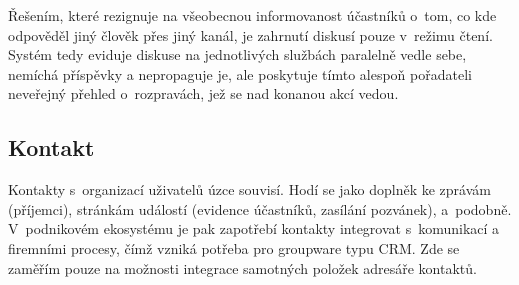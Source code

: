 \documentclass[12pt,oneside,final]{fithesis2}
\begin{document}
Řešením, které rezignuje na všeobecnou informovanost účastníků o~tom, co kde odpověděl jiný člověk přes jiný kanál, je zahrnutí diskusí pouze v~režimu čtení. Systém tedy eviduje diskuse na jednotlivých službách paralelně vedle sebe, nemíchá příspěvky a nepropaguje je, ale poskytuje tímto alespoň pořadateli neveřejný přehled o~rozpravách, jež se nad konanou akcí vedou.

\subsection{Kontakt}
Kontakty s~organizací uživatelů úzce souvisí. Hodí se jako doplněk ke zprávám (příjemci), stránkám událostí (evidence účastníků, zasílání pozvánek), a~po\-dob\-ně. V~pod\-ni\-ko\-vém eko\-sys\-té\-mu je pak zapotřebí kontakty integrovat s~komunikací a firemními procesy, čímž vzniká potřeba pro groupware typu CRM. Zde se zaměřím pouze na možnosti integrace samotných položek adresáře kontaktů.
\end{document}
